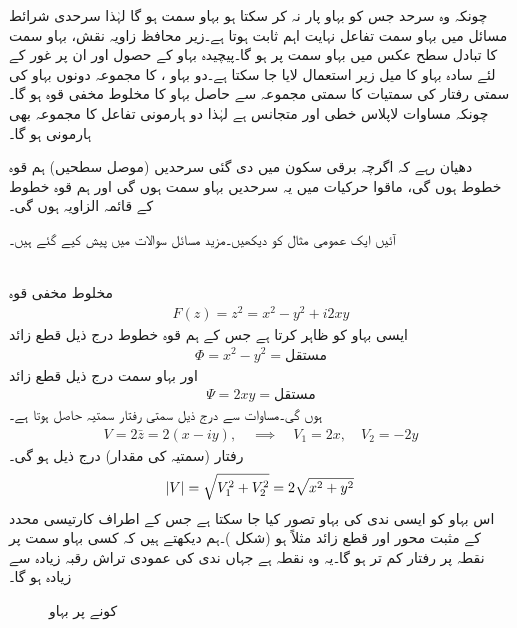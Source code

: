 چونکہ وہ سرحد جس کو بہاو پار نہ کر سکتا ہو بہاو سمت ہو گا لہٰذا سرحدی شرائط مسائل میں بہاو سمت تفاعل  نہایت اہم  ثابت ہوتا ہے۔زیر محافظ زاویہ نقش، بہاو سمت کا تبادل سطح عکس میں بہاو سمت پر ہو گا۔پیچیدہ بہاو کے حصول اور ان پر غور کے لئے سادہ بہاو کا میل زیر استعمال لایا جا سکتا ہے۔دو بہاو ،  کا مجموعہ  دونوں بہاو کی سمتی رفتار کی سمتیات کا سمتی مجموعہ سے حاصل بہاو کا مخلوط مخفی قوہ ہو گا۔چونکہ مساوات لاپلاس خطی اور متجانس ہے  لہٰذا دو ہارمونی تفاعل کا مجموعہ بھی  ہارمونی ہو گا۔

دھیان رہے کہ اگرچہ برقی سکون میں دی گئی سرحدیں (موصل سطحیں) ہم قوہ خطوط ہوں گی، ماقوا حرکیات میں یہ سرحدیں بہاو سمت ہوں گی اور ہم قوہ خطوط کے قائمہ الزاویہ ہوں گی۔    

آئیں ایک عمومی مثال کو دیکھیں۔مزید مسائل سوالات میں پیش کیے گئے ہیں۔

\quad {}\\
مخلوط مخفی قوہ 
\begin{align}
F(z)=z^2=x^2-y^2+i2xy
\end{align}
ایسی بہاو کو ظاہر کرتا ہے  جس کے ہم قوہ خطوط درج ذیل  قطع زائد
\begin{align*}
\Phi=x^2-y^2=\text{مستقل}
\end{align*}
اور بہاو سمت درج ذیل  قطع زائد
\begin{align*}
\Psi=2xy=\text{مستقل}
\end{align*}
ہوں گی۔مساوات  سے درج ذیل سمتی رفتار سمتیہ حاصل ہوتا ہے۔
\begin{align*}
V=2\bar{z}=2(x-iy),\quad \implies\quad V_1=2x,\quad V_2=-2y
\end{align*}
رفتار (سمتیہ کی مقدار) درج ذیل ہو گی۔
\begin{align*}
\abs{V}=\sqrt{V_1^2+V_2^2}=2\sqrt{x^2+y^2}
\end{align*}
اس بہاو کو ایسی ندی کی بہاو تصور کیا جا سکتا ہے جس کے اطراف کارتیسی محدد کے مثبت محور اور قطع زائد مثلاً  ہو (شکل )۔ہم دیکھتے ہیں کہ کسی بہاو سمت  پر  نقطہ  پر رفتار کم تر ہو گا۔یہ وہ نقطہ ہے جہاں ندی کی عمودی تراش رقبہ زیادہ سے زیادہ ہو گا۔
\begin{figure}
\centering
{}
\caption{کونے پر بہاو}
\label{شکل_مخفی_قوہ_کونے_پر_بہاو}
\end{figure}

